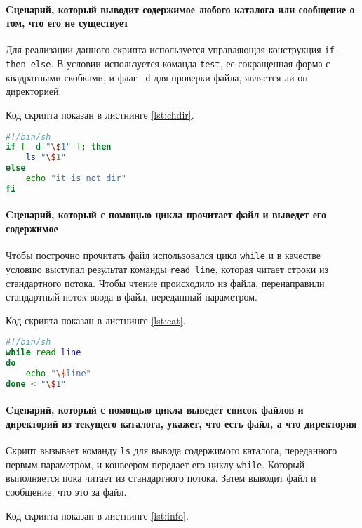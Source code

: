 \paragraph{Cценарий, который выводит содержимое любого каталога
или сообщение о том, что его не существует}\mbox{}\par
Для реализации данного скрипта используется управляющая конструкция
\texttt{if-then-else}. В условии используется команда \texttt{test},
ее сокращенная форма с квадратными скобками, и флаг \texttt{-d}
для проверки файла, является ли он директорией.\par
Код скрипта показан в листнинге \ref{lst:chdir}.

\begin{lstlisting}[language=Bash
	, caption=\leftline{Проверка на директорию}
	, label=lst:chdir]
#!/bin/sh
if [ -d "\$1" ]; then
	ls "\$1"
else
	echo "it is not dir"
fi
\end{lstlisting}

\paragraph{Cценарий, который с помощью цикла прочитает файл и
выведет его содержимое}\mbox{}\par
Чтобы построчно прочитать файл использовался цикл \texttt{while} и в качестве
условию выступал результат команды \texttt{read line}, которая читает строки
из стандартного потока. Чтобы чтение происходило из файла, перенаправили
стандартный поток ввода в файл, переданный параметром.\par
Код скрипта показан в листнинге \ref{lst:cat}.

\begin{lstlisting}[language=Bash
	, caption=\leftline{Вывод содержимого файла}
	, label=lst:cat]
#!/bin/sh
while read line
do
	echo "\$line"
done < "\$1"
\end{lstlisting}

\paragraph{Cценарий, который с помощью цикла выведет список
файлов и директорий из текущего каталога, укажет, что есть файл, а
что директория}\mbox{}\par
Скрипт вызывает команду \texttt{ls} для вывода содержимого каталога,
переданного первым параметром, и конвеером передает его циклу
\texttt{while}. Который выполняется пока читает из стандартного потока.
Затем выводит файл и сообщение, что это за файл.\par
Код скрипта показан в листнинге \ref{lst:info}.

